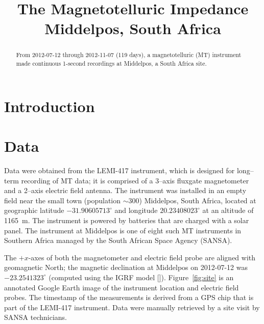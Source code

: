 \documentclass[draft,linenumbers]{agujournal2018}
\begin{document}
\title{The Magnetotelluric Impedance Middelpos, South Africa}





\begin{abstract}
From 2012-07-12 through 2012-11-07 (119 days), a magnetotelluric (MT) instrument made continuous 1-second recordings at Middelpos, a South Africa site.
\end{abstract}

\section{Introduction}

\section{Data}
\label{section:Data}

Data were obtained from the LEMI-417 instrument, which is designed for long--term recording of MT data; it is comprised of a 3--axis fluxgate magnetometer and a 2--axis electric field antenna. The instrument was installed in an empty field near the small town (population $\sim$300) Middelpos, South Africa, located at geographic latitude $-31.90605713^\circ$ and longitude $20.23408023^\circ$ at an altitude of 1165~m. The instrument is powered by batteries that are charged with a solar panel. The instrument at Middelpos is one of eight such MT instruments in Southern Africa managed by the South African Space Agency (SANSA).

The $+x$-axes of both the magnetometer and electric field probe are aligned with geomagnetic North; the magnetic declination at Middelpos on 2012-07-12 was $-23.2541323^\circ$ (computed using the IGRF model [\cite{igrf}]). Figure~\ref{fig:site} is an annotated Google Earth image of the instrument location and electric field probes. The timestamp of the measurements is derived from a GPS chip that is part of the LEMI-417 instrument. Data were manually retrieved by a site visit by SANSA technicians. 
\end{document}

